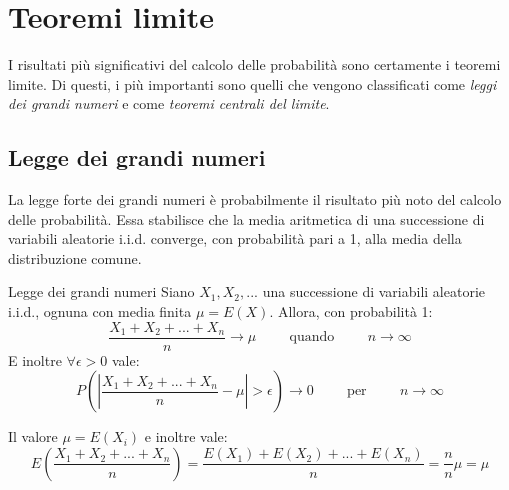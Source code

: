 \chapter{Teoremi limite}
I risultati più significativi del calcolo delle probabilità sono certamente i teoremi limite. Di questi, i più importanti sono quelli che vengono classificati come \textit{leggi dei grandi numeri} e come \textit{teoremi centrali del limite}.

\section{Legge dei grandi numeri}
La legge forte dei grandi numeri è probabilmente il risultato più noto del calcolo delle probabilità. Essa stabilisce che la media aritmetica di una successione di variabili aleatorie i.i.d. converge, con probabilità pari a 1, alla media della distribuzione comune.

\begin{Thm}{Legge dei grandi numeri}{}
    Siano $X_1, X_2,...$ una successione di variabili aleatorie i.i.d., ognuna con media finita $\mu=E(X)$. Allora, con probabilità 1:
    \begin{equation*}
        \frac{X_1+X_2+...+X_n}{n}\to\mu\hspace{1cm}\mbox{quando}\hspace{1cm}n\to\infty
    \end{equation*}
    E inoltre $\forall\epsilon>0$ vale:
    \begin{equation*}
        P\left(\left|\frac{X_1+X_2+...+X_n}{n}-\mu\right|>\epsilon\right)\to0\hspace{1cm}\mbox{per}\hspace{1cm}n\to\infty
    \end{equation*}
\end{Thm}

Il valore $\mu=E(X_i)$ e inoltre vale:
\begin{equation*}
    E\left(\frac{X_1+X_2+...+X_n}{n}\right)=\frac{E(X_1)+E(X_2)+...+E(X_n)}{n}=\frac{n}{n}\mu=\mu
\end{equation*}

